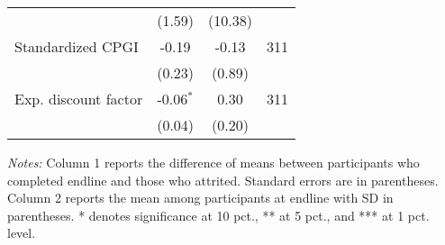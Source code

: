 \begin{table}[h]
{\begin{threeparttable}
\begin{tabular}{l*{3}{c}}
          &   (1.59)&  (10.38)&         \\
Standardized CPGI&    -0.19&    -0.13&      311\\
          &   (0.23)&   (0.89)&         \\
Exp. discount factor&-0.06$^{*}$&     0.30&      311\\
          &   (0.04)&   (0.20)&         \\
\bottomrule \end{tabular} \begin{tablenotes}[flushleft] \footnotesize \item \emph{Notes:} Column 1 reports the difference of means between participants who completed endline and those who attrited. Standard errors are in parentheses. Column 2 reports the mean among participants at endline with SD in parentheses. * denotes significance at 10 pct., ** at 5 pct., and *** at 1 pct. level. \end{tablenotes} \end{threeparttable} } \end{table}


